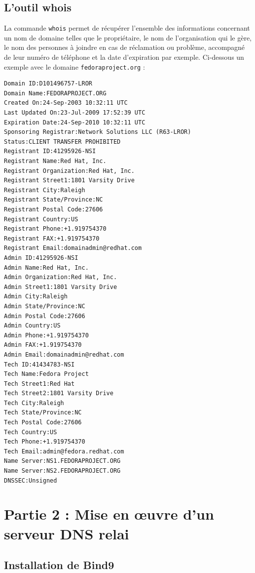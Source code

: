 \documentclass[12pt,a4paper,notitlepage]{article}
\begin{document}
\subsection{L'outil whois}
La commande \texttt{whois} permet de récupérer l'ensemble des informations concernant un nom de domaine telles que le propriétaire, le nom de l'organisation qui le gère, le nom des personnes à joindre en cas de réclamation ou problème, accompagné de leur numéro de téléphone et la date d'expiration par exemple.
Ci-dessous un exemple avec le domaine \texttt{fedoraproject.org} :\\
\begin{lstlisting}[title=Résultat de la commande whois]
Domain ID:D101496757-LROR
Domain Name:FEDORAPROJECT.ORG
Created On:24-Sep-2003 10:32:11 UTC
Last Updated On:23-Jul-2009 17:52:39 UTC
Expiration Date:24-Sep-2010 10:32:11 UTC
Sponsoring Registrar:Network Solutions LLC (R63-LROR)
Status:CLIENT TRANSFER PROHIBITED
Registrant ID:41295926-NSI
Registrant Name:Red Hat, Inc.
Registrant Organization:Red Hat, Inc.
Registrant Street1:1801 Varsity Drive
Registrant City:Raleigh
Registrant State/Province:NC
Registrant Postal Code:27606
Registrant Country:US
Registrant Phone:+1.919754370
Registrant FAX:+1.919754370
Registrant Email:domainadmin@redhat.com
Admin ID:41295926-NSI
Admin Name:Red Hat, Inc.
Admin Organization:Red Hat, Inc.
Admin Street1:1801 Varsity Drive
Admin City:Raleigh
Admin State/Province:NC
Admin Postal Code:27606
Admin Country:US
Admin Phone:+1.919754370
Admin FAX:+1.919754370
Admin Email:domainadmin@redhat.com
Tech ID:41434783-NSI
Tech Name:Fedora Project
Tech Street1:Red Hat
Tech Street2:1801 Varsity Drive
Tech City:Raleigh
Tech State/Province:NC
Tech Postal Code:27606
Tech Country:US
Tech Phone:+1.919754370
Tech Email:admin@fedora.redhat.com
Name Server:NS1.FEDORAPROJECT.ORG
Name Server:NS2.FEDORAPROJECT.ORG
DNSSEC:Unsigned
\end{lstlisting}

\clearpage
\section{Partie 2 : Mise en \oe uvre d'un serveur DNS relai}
\subsection{Installation de Bind9}
\end{document}

